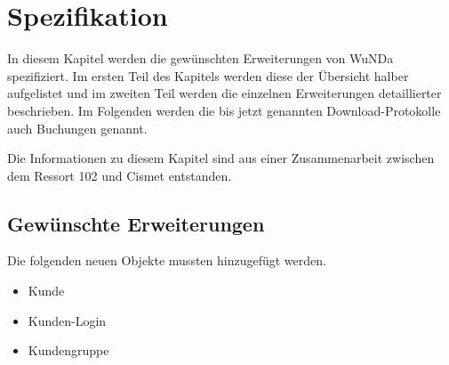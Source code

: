 \chapter{Spezifikation}
In diesem Kapitel werden die gewünschten Erweiterungen von \ac{WuNDa} spezifiziert. Im ersten Teil des Kapitels werden diese der Übersicht halber aufgelistet und im zweiten Teil werden die einzelnen Erweiterungen detaillierter beschrieben. Im Folgenden werden die bis jetzt genannten Download-Protokolle auch Buchungen genannt. 

Die Informationen zu diesem Kapitel sind aus einer Zusammenarbeit zwischen dem Ressort 102 und Cismet entstanden. 
\section{Gewünschte Erweiterungen}
Die folgenden neuen Objekte mussten hinzugefügt werden.
\begin{itemize}
\item Kunde
\item Kunden-Login
\item Kundengruppe
\end{itemize}

